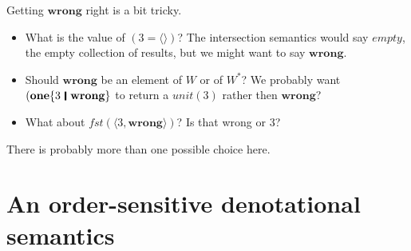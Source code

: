 \documentclass[acmsmall,review,dvipsnames]{acmart}
\newcommand{\Varid}[1]{\mathit{#1}}
\newcommand{\Value}{W}
\newcommand{\mtype}{\Value^{*}}
\newcommand{\mempty}{\mathit{empty}}
\newcommand{\munit}{\mathit{unit}}
\newcommand{\wrong}{\mathbf{wrong}}
\begin{document}
Getting $\wrong$ right is a bit tricky.


\begin{itemize}
\item What is the value of \ensuremath{(\mathrm{3}\mathrel{=}\langle\rangle)}?  The intersection semantics would say $\mempty$, the empty collection
  of results, but we might want to say $\wrong$.
\item Should $\wrong$ be an element of $\Value$ or of $\mtype$?  We probably want \ensuremath{(\textbf{one}\{\mathrm{3}\hspace{0.2em}\mathop{\rule[-0.1em]{0.15em}{0.75em}}\hspace{0.2em}\textbf{wrong}\}}
  to return a $\munit(3)$ rather then $\wrong$?
\item What about \ensuremath{\Varid{fst}(\langle{}\mathrm{3},\textbf{wrong}\rangle)}?  Is that wrong or 3?
\end{itemize}

There is probably more than one possible choice here.


\section{An order-sensitive denotational semantics} \label{sec:order-sensitive}

\newcommand{\LblValue}{LW}
\newcommand{\Lbl}{\mathbf{Lbl}}
\newcommand{\lblemp}{\epsilon}
\newcommand{\lbll}[1]{{\bf L}\;#1}
\newcommand{\lblr}[1]{{\bf R}\;#1}
\newcommand{\lblseq}[2]{#1 \sconcat #2}
\newcommand{\domplus}{\, + \,}
\newcommand{\msort}{\mathit{sort}}
\end{document}
